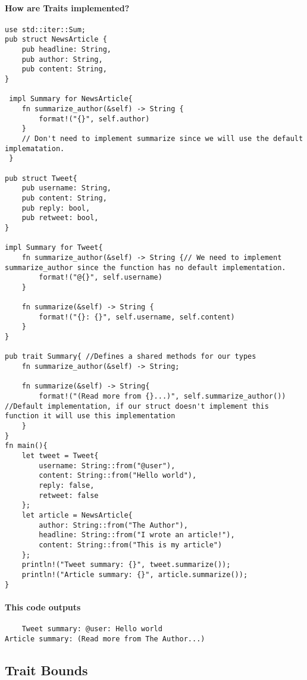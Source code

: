 \paragraph*{How are Traits implemented?}\begin{lstlisting}
use std::iter::Sum;
pub struct NewsArticle {
    pub headline: String,
    pub author: String,
    pub content: String,
}

 impl Summary for NewsArticle{
    fn summarize_author(&self) -> String { 
        format!("{}", self.author) 
    }
    // Don't need to implement summarize since we will use the default implematation.
 }

pub struct Tweet{
    pub username: String,
    pub content: String, 
    pub reply: bool,
    pub retweet: bool,
}

impl Summary for Tweet{
    fn summarize_author(&self) -> String {// We need to implement summarize_author since the function has no default implementation. 
        format!("@{}", self.username) 
    }

    fn summarize(&self) -> String {
        format!("{}: {}", self.username, self.content)
    }
}

pub trait Summary{ //Defines a shared methods for our types
    fn summarize_author(&self) -> String;
    
    fn summarize(&self) -> String{
        format!("(Read more from {}...)", self.summarize_author()) //Default implementation, if our struct doesn't implement this function it will use this implementation
    }
}
fn main(){
    let tweet = Tweet{
        username: String::from("@user"),
        content: String::from("Hello world"),
        reply: false,
        retweet: false
    };
    let article = NewsArticle{
        author: String::from("The Author"),
        headline: String::from("I wrote an article!"),
        content: String::from("This is my article")
    };
    println!("Tweet summary: {}", tweet.summarize()); 
    println!("Article summary: {}", article.summarize()); 
}
\end{lstlisting}

\paragraph*{This code outputs}\begin{lstlisting}
    Tweet summary: @user: Hello world
Article summary: (Read more from The Author...)
\end{lstlisting}

\newpage
\subsection{Trait Bounds}
